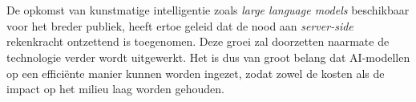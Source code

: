 
%
%
%
%
%

%



\chapter*{}

De opkomst van kunstmatige intelligentie zoals \textit{large language models} beschikbaar voor het breder publiek, heeft ertoe geleid dat de nood aan \textit{server-side} rekenkracht ontzettend is toegenomen. Deze groei zal doorzetten naarmate de technologie verder wordt uitgewerkt. Het is dus van groot belang dat AI-modellen op een efficiënte manier kunnen worden ingezet, zodat zowel de kosten als de impact op het milieu laag worden gehouden. 

